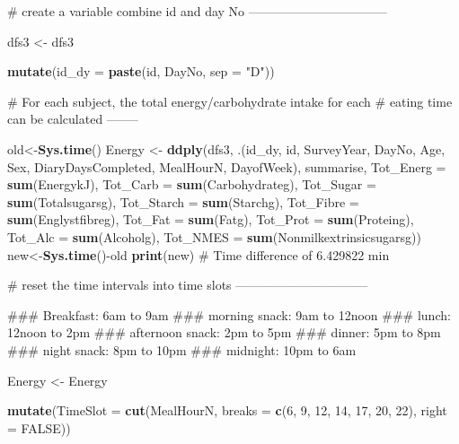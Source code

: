 \documentclass[]{article}
\newenvironment{Shaded}{\begin{snugshade}}{\end{snugshade}}
\newcommand{\KeywordTok}[1]{\textcolor[rgb]{0.12,0.11,0.11}{\textbf{#1}}}
\newcommand{\DataTypeTok}[1]{\textcolor[rgb]{0.00,0.34,0.68}{#1}}
\newcommand{\DecValTok}[1]{\textcolor[rgb]{0.69,0.50,0.00}{#1}}
\newcommand{\StringTok}[1]{\textcolor[rgb]{0.75,0.01,0.01}{#1}}
\newcommand{\CommentTok}[1]{\textcolor[rgb]{0.54,0.53,0.53}{#1}}
\newcommand{\OtherTok}[1]{\textcolor[rgb]{0.00,0.43,0.16}{#1}}
\newcommand{\OperatorTok}[1]{\textcolor[rgb]{0.12,0.11,0.11}{#1}}
\newcommand{\NormalTok}[1]{\textcolor[rgb]{0.12,0.11,0.11}{#1}}
\begin{document}
\begin{Shaded}
\begin{Highlighting}[]
\CommentTok{# create a variable combine id and day No ---------------------------------}


\NormalTok{dfs3 <-}\StringTok{ }\NormalTok{dfs3 }\OperatorTok{%>%}\StringTok{ }
\StringTok{  }\KeywordTok{mutate}\NormalTok{(}\DataTypeTok{id_dy =} \KeywordTok{paste}\NormalTok{(id, DayNo, }\DataTypeTok{sep =} \StringTok{"D"}\NormalTok{))}

\CommentTok{# For each subject, the total energy/carbohydrate intake for each }
\CommentTok{# eating time can be calculated --------}

\NormalTok{old<-}\KeywordTok{Sys.time}\NormalTok{()}
\NormalTok{Energy <-}\StringTok{ }\KeywordTok{ddply}\NormalTok{(dfs3, .(id_dy, id, SurveyYear, DayNo, Age, Sex, }
\NormalTok{                        DiaryDaysCompleted, MealHourN, DayofWeek),  }
\NormalTok{                summarise, }\DataTypeTok{Tot_Energ =} \KeywordTok{sum}\NormalTok{(EnergykJ), }
                \DataTypeTok{Tot_Carb =} \KeywordTok{sum}\NormalTok{(Carbohydrateg), }
                \DataTypeTok{Tot_Sugar =} \KeywordTok{sum}\NormalTok{(Totalsugarsg), }
                \DataTypeTok{Tot_Starch =} \KeywordTok{sum}\NormalTok{(Starchg), }
                \DataTypeTok{Tot_Fibre =} \KeywordTok{sum}\NormalTok{(Englystfibreg),}
                \DataTypeTok{Tot_Fat   =} \KeywordTok{sum}\NormalTok{(Fatg), }
                \DataTypeTok{Tot_Prot  =} \KeywordTok{sum}\NormalTok{(Proteing), }
                \DataTypeTok{Tot_Alc   =} \KeywordTok{sum}\NormalTok{(Alcoholg), }
                \DataTypeTok{Tot_NMES  =} \KeywordTok{sum}\NormalTok{(Nonmilkextrinsicsugarsg))}
\NormalTok{new<-}\KeywordTok{Sys.time}\NormalTok{()}\OperatorTok{-}\NormalTok{old}
\KeywordTok{print}\NormalTok{(new)}
\CommentTok{# Time difference of 6.429822 min}


\CommentTok{# reset the time intervals into time slots --------------------------------}

\NormalTok{### Breakfast:       6am to 9am}
\NormalTok{### morning snack:   9am to 12noon}
\NormalTok{### lunch:           12noon to 2pm}
\NormalTok{### afternoon snack: 2pm to 5pm}
\NormalTok{### dinner:          5pm to 8pm}
\NormalTok{### night snack:     8pm to 10pm}
\NormalTok{### midnight:        10pm to 6am}


\NormalTok{Energy <-}\StringTok{ }\NormalTok{Energy }\OperatorTok{%>%}\StringTok{ }
\StringTok{  }\KeywordTok{mutate}\NormalTok{(}\DataTypeTok{TimeSlot =} \KeywordTok{cut}\NormalTok{(MealHourN, }\DataTypeTok{breaks =} \KeywordTok{c}\NormalTok{(}\DecValTok{6}\NormalTok{, }\DecValTok{9}\NormalTok{, }\DecValTok{12}\NormalTok{, }\DecValTok{14}\NormalTok{, }\DecValTok{17}\NormalTok{, }\DecValTok{20}\NormalTok{, }\DecValTok{22}\NormalTok{), }
                        \DataTypeTok{right =} \OtherTok{FALSE}\NormalTok{))}


}}
\end{Highlighting}
\end{Shaded}
\end{document}
